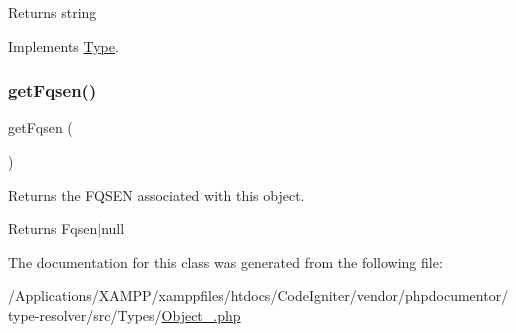 \begin{DoxyReturn}{Returns}
string 
\end{DoxyReturn}


Implements \mbox{\hyperlink{interfacephp_documentor_1_1_reflection_1_1_type_a7516ca30af0db3cdbf9a7739b48ce91d}{Type}}.

\mbox{\label{classphp_documentor_1_1_reflection_1_1_types_1_1_object___a07132fe536354352c87e6447d512bf3b}} 
\subsubsection{\texorpdfstring{get\+Fqsen()}{getFqsen()}}
{\footnotesize\ttfamily get\+Fqsen (\begin{DoxyParamCaption}{ }\end{DoxyParamCaption})}

Returns the F\+Q\+S\+EN associated with this object.

\begin{DoxyReturn}{Returns}
Fqsen$\vert$null 
\end{DoxyReturn}


The documentation for this class was generated from the following file\+:\begin{DoxyCompactItemize}
\item 
/\+Applications/\+X\+A\+M\+P\+P/xamppfiles/htdocs/\+Code\+Igniter/vendor/phpdocumentor/type-\/resolver/src/\+Types/\mbox{\hyperlink{_object___8php}{Object\+\_\+.\+php}}\end{DoxyCompactItemize}

